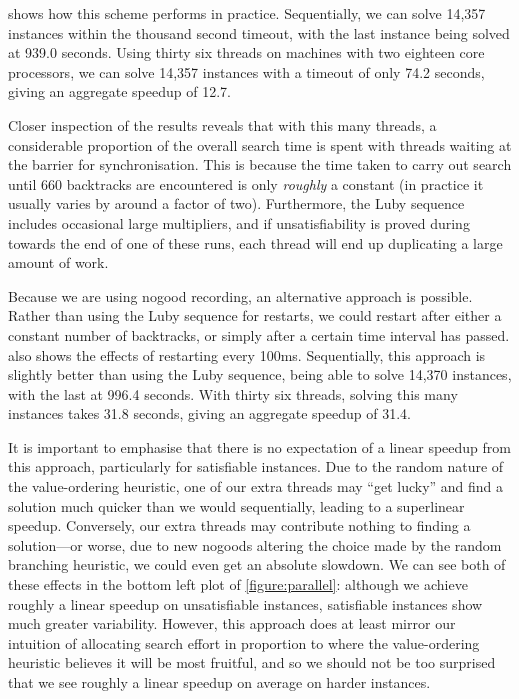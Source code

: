 \documentclass[runningheads]{llncs}
\begin{document}
 shows how this scheme performs in practice. Sequentially, we can solve 14,357
instances within the thousand second timeout, with the last instance being solved at 939.0 seconds.
Using thirty six threads on machines with two eighteen core processors, we can solve 14,357
instances with a timeout of only 74.2 seconds, giving an aggregate speedup of 12.7.

Closer inspection of the results reveals that with this many threads, a considerable proportion of
the overall search time is spent with threads waiting at the barrier for synchronisation. This is
because the time taken to carry out search until 660 backtracks are encountered is only
\emph{roughly} a constant (in practice it usually varies by around a factor of two). Furthermore,
the Luby sequence includes occasional large multipliers, and if unsatisfiability is proved during
towards the end of one of these runs, each thread will end up duplicating a large amount of work.

Because we are using nogood recording, an alternative approach is possible. Rather than using the
Luby sequence for restarts, we could restart after either a constant number of backtracks, or simply
after a certain time interval has passed.  also shows the effects of restarting
every 100ms. Sequentially, this approach is slightly better than using the Luby sequence, being able to
solve 14,370 instances, with the last at 996.4 seconds. With thirty six threads, solving this many
instances takes 31.8 seconds, giving an aggregate speedup of 31.4.

It is important to emphasise that there is no expectation of a linear speedup from this approach,
particularly for satisfiable instances. Due to the random nature of the value-ordering heuristic,
one of our extra threads may ``get lucky'' and find a solution much quicker than we would
sequentially, leading to a superlinear speedup. Conversely, our extra threads may contribute nothing to finding a
solution---or worse, due to new nogoods altering the choice made by the random branching heuristic,
we could even get an absolute slowdown. We can see both of these effects in the bottom left plot of
\cref{figure:parallel}: although we achieve roughly a linear speedup on unsatisfiable instances,
satisfiable instances show much greater variability. However, this approach does at least mirror our intuition of
allocating search effort in proportion to where the value-ordering heuristic believes it will be
most fruitful, and so we should not be too surprised that we see roughly a linear speedup on average
on harder instances.
\end{document}
